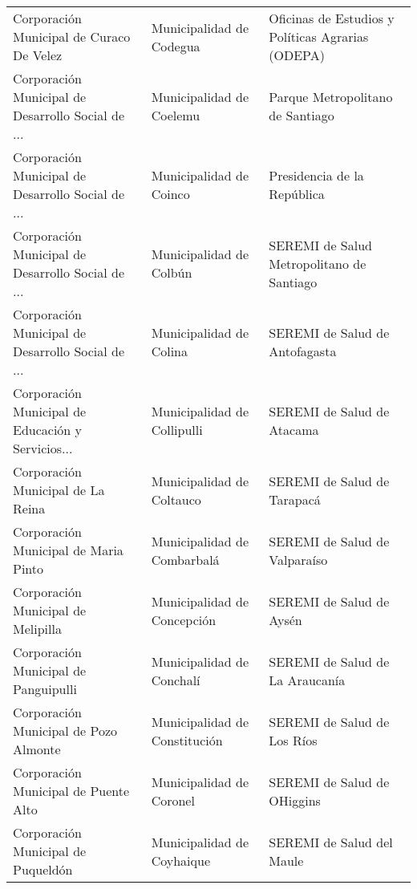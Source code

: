 \documentclass[11pt]{article}
\begin{document}
\begin{longtable}{ p{5cm} | p{5cm} | p{5cm} }
          Corporación Municipal de Curaco De Velez &                           Municipalidad de Codegua &  Oficinas de Estudios y Políticas Agrarias (ODEPA) \\
 Corporación Municipal de Desarrollo Social de ... &                           Municipalidad de Coelemu &                   Parque Metropolitano de Santiago \\
 Corporación Municipal de Desarrollo Social de ... &                            Municipalidad de Coinco &                        Presidencia de la República \\
 Corporación Municipal de Desarrollo Social de ... &                            Municipalidad de Colbún &         SEREMI de Salud  Metropolitano de Santiago \\
 Corporación Municipal de Desarrollo Social de ... &                            Municipalidad de Colina &                    SEREMI de Salud  de Antofagasta \\
 Corporación Municipal de Educación y Servicios... &                        Municipalidad de Collipulli &                        SEREMI de Salud  de Atacama \\
                 Corporación Municipal de La Reina &                          Municipalidad de Coltauco &                       SEREMI de Salud  de Tarapacá \\
              Corporación Municipal de Maria Pinto &                        Municipalidad de Combarbalá &                     SEREMI de Salud  de Valparaíso \\
                Corporación Municipal de Melipilla &                        Municipalidad de Concepción &                           SEREMI de Salud de Aysén \\
              Corporación Municipal de Panguipulli &                          Municipalidad de Conchalí &                    SEREMI de Salud de La Araucanía \\
             Corporación Municipal de Pozo Almonte &                      Municipalidad de Constitución &                        SEREMI de Salud de Los Ríos \\
              Corporación Municipal de Puente Alto &                           Municipalidad de Coronel &                        SEREMI de Salud de OHiggins \\
                Corporación Municipal de Puqueldón &                         Municipalidad de Coyhaique &                          SEREMI de Salud del Maule \\

\end{longtable}
\end{document}
